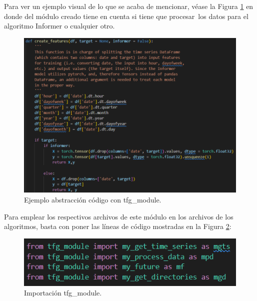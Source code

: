 Para ver un ejemplo visual de lo que se acaba de mencionar, véase la Figura \ref{ejAbstraccion} en donde  del módulo creado tiene en cuenta si tiene que procesar\fnm\ los datos para el algoritmo Informer o cualquier otro.
\begin{figure}[H]
    \centering
    \includegraphics[scale = 0.65]{imgs/ej_module.png}
    \caption{Ejemplo abstracción código con tfg\_module.}
    \label{ejAbstraccion}
\end{figure}

Para emplear los respectivos archivos  de este módulo en los archivos  de los algoritmos, basta con poner las líneas de código mostradas en la Figura \ref{importacionModulo}:

\begin{figure}[H]
    \centering
    \includegraphics[scale = 0.7]{imgs/importacion_modulo.png}
    \caption[Importación tfg\_module.]{Importación tfg\_module\protect\fnm.}
    \label{importacionModulo}
\end{figure}




